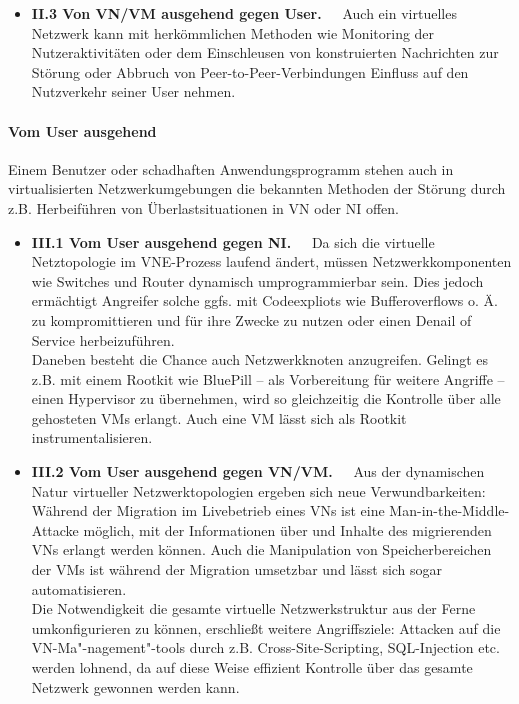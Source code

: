 \begin{itemize}
\item \textbf{II.3 Von VN/VM ausgehend gegen User.~~}
Auch ein virtuelles Netzwerk kann mit herkömmlichen Methoden wie Monitoring der Nutzeraktivitäten oder dem Einschleusen von konstruierten Nachrichten zur Störung oder Abbruch von Peer-to-Peer-Verbindungen Einfluss auf den Nutzverkehr seiner User nehmen.
\end{itemize}



\paragraph{Vom User ausgehend}
\label{parag:vonUser}
Einem Benutzer oder schadhaften Anwendungsprogramm stehen auch in virtualisierten Netzwerkumgebungen die bekannten Methoden der Störung durch z.B. Herbeiführen von Überlastsituationen in VN oder NI offen.

\begin{itemize}
	\item \textbf{III.1 Vom User ausgehend gegen NI.~~}
	Da sich die virtuelle Netztopologie im VNE-Prozess laufend ändert, müssen Netzwerkkomponenten wie Switches und Router dynamisch umprogrammierbar sein. Dies jedoch ermächtigt Angreifer solche ggfs. mit Codeexpliots wie Bufferoverflows o. Ä. zu kompromittieren und für ihre Zwecke zu nutzen oder einen Denail of Service herbeizuführen.\\
	Daneben besteht die Chance auch Netzwerkknoten anzugreifen. Gelingt es z.B. mit einem Rootkit wie BluePill \cite{rutkowska2008bluepilling} -- als Vorbereitung für weitere Angriffe -- einen Hypervisor zu übernehmen, wird so gleichzeitig die Kontrolle über alle gehosteten VMs erlangt. Auch eine VM lässt sich als Rootkit instrumentalisieren. \cite{wu2010network}
	\item \textbf{III.2 Vom User ausgehend gegen VN/VM.~~}
	Aus der dynamischen Natur virtueller Netzwerktopologien ergeben sich neue Verwundbarkeiten: Während der Migration im Livebetrieb eines VNs ist eine Man-in-the-Middle-Attacke möglich, mit der Informationen über und Inhalte des migrierenden VNs erlangt werden können. \cite{natarajansecurity} Auch die Manipulation von Speicherbereichen der VMs ist während der Migration umsetzbar und lässt sich sogar automatisieren. \cite{oberheide2008empirical}\\
	Die Notwendigkeit die gesamte virtuelle Netzwerkstruktur aus der Ferne umkonfigurieren zu können, erschließt weitere Angriffsziele: Attacken auf die VN-Ma"-nagement"-tools durch z.B. Cross-Site-Scripting, SQL-Injection etc. werden lohnend, da auf diese Weise effizient Kontrolle über das gesamte Netzwerk gewonnen werden kann.	
\end{itemize}


